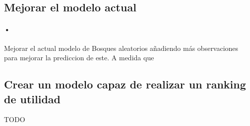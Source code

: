 \subsection{Mejorar el modelo actual}
\paragraph{•} Mejorar el actual modelo de Bosques aleatorios añadiendo más observaciones para mejorar la prediccion de este. A medida que 


\subsection{Crear un modelo capaz de realizar un ranking de utilidad}
TODO